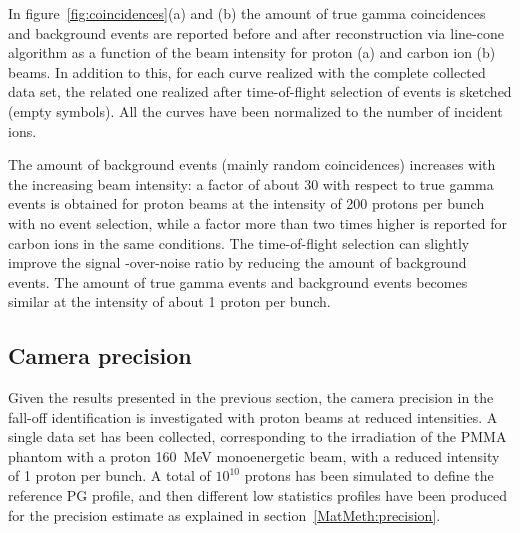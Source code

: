 In figure~\ref{fig:coincidences}(a) and (b) the amount of true gamma coincidences and background events are reported before and after reconstruction via line-cone algorithm as a function of the beam intensity for proton (a) and carbon ion (b) beams. In addition to this, for each curve realized with the complete collected data set, the related one realized after time-of-flight selection of events is sketched (empty symbols). All the curves have been normalized to the number of incident ions.

The amount of background events (mainly random coincidences) increases with the increasing beam intensity: a factor of about 30 with respect to true gamma events is obtained for proton beams at  the intensity of 200 protons per bunch with no event selection, while a factor more than two times higher is reported for carbon ions in the same conditions. The time-of-flight selection can slightly improve the signal -over-noise ratio by reducing the amount of background events. The amount of true gamma events and background events becomes similar at the intensity of about 1 proton per bunch.


\subsection{Camera precision}
\label{Results::precision_reconstruction}
Given the results presented in the previous section, the camera precision in the fall-off identification is investigated with proton beams at reduced intensities.
A single data set has been collected, corresponding to the irradiation of the PMMA phantom with a proton 160~MeV monoenergetic beam, with a reduced intensity of 1 proton per bunch. A total of $10^{10}$ protons has been simulated to define the reference PG profile, and then different low statistics profiles have been produced for the precision estimate as explained in section~\ref{MatMeth:precision}. 

